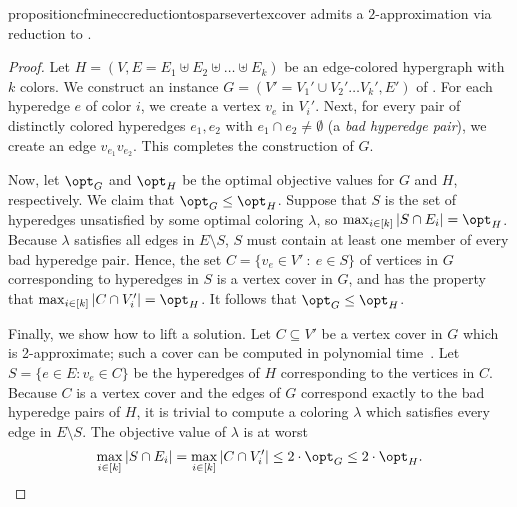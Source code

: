 \begin{restatable}{proposition}{cfmineccreductiontosparsevertexcover}\label{thm:cfminecc-reduce-sparse-vc}
    \cfminECC{} admits a $2$-approximation via reduction to \SVC{}.
\end{restatable}
\begin{proof}
    Let $H = (V, E = E_1 \uplus E_2 \uplus \ldots \uplus E_k)$ be an edge-colored hypergraph with $k$ colors.
    We construct an instance $G = (V' = V_1' \cup V_2' \ldots V_k', E')$ of \SVC{}. For each hyperedge $e$ of color $i$, we create a vertex $v_e$ in $V_i'$.
    Next, for every pair of distinctly colored hyperedges $e_1, e_2$ with $e_1 \cap e_2 \neq \emptyset$ (a \emph{bad hyperedge pair}), we create an edge $v_{e_1}v_{e_2}$.
    This completes the construction of $G$.

    Now, let $\opt_G$ and $\opt_H$ be the optimal objective values for $G$ and $H$, respectively. We claim that
    $\opt_G \leq \opt_H$. Suppose that $S$ is the set of hyperedges unsatisfied by some optimal coloring $\lambda$, so $\max_{i \in [k]} |S \cap E_i| = \opt_H$.
    Because $\lambda$ satisfies all edges in $E \setminus S$, $S$ must contain at least one member of every bad hyperedge pair.
    Hence, the set $C = \{v_e \in V' \ \colon \ e \in S \}$ of vertices in $G$ corresponding to hyperedges in $S$ is a vertex cover in $G$, and has the property that $\max_{i \in [k]} |C \cap V_i'| = \opt_H$.
    It follows that $\opt_G \leq \opt_H$.

    Finally, we show how to lift a solution. Let $C \subseteq V'$ be a vertex cover in $G$ which is 2-approximate; such a cover can be computed in polynomial time~\cite{blum2022sparse}.
    Let $S = \{e \in E : v_e \in C\}$ be the hyperedges of $H$ corresponding to the vertices in $C$.
    Because $C$ is a vertex cover and the edges of $G$ correspond exactly to the bad hyperedge pairs of $H$, it is trivial to compute a
    coloring $\lambda$ which satisfies every edge in $E \setminus S$. The objective value of $\lambda$
    is at worst
    \[
        \max_{i \in [k]} |S \cap E_i| = \max_{i \in [k]} |C \cap V_i'| \leq 2\cdot \opt_G \leq 2\cdot \opt_H.
    \]

\end{proof}

